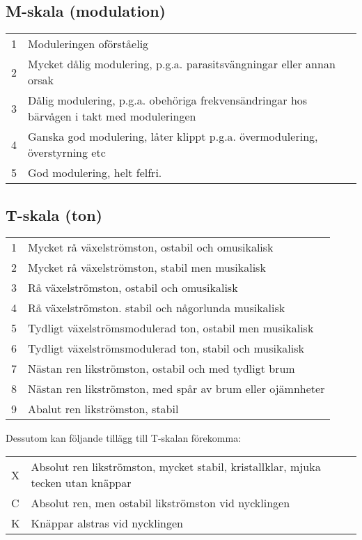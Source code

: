 \subsection{M-skala (modulation)}

\begin{tabular}{p{}p{}}
1 & Moduleringen oförståelig \\
2 & Mycket dålig modulering, p.g.a. parasitsvängningar eller annan orsak \\
3 & Dålig modulering, p.g.a. obehöriga frekvensändringar hos bärvågen i takt med moduleringen \\
4 & Ganska god modulering, låter klippt p.g.a. övermodulering, överstyrning etc \\
5 & God modulering, helt felfri. \\
\end{tabular}

\subsection{T-skala (ton)}

\begin{tabular}{p{}p{}}
1 & Mycket rå växelströmston, ostabil och omusikalisk \\
2 & Mycket rå växelströmston, stabil men musikalisk \\
3 & Rå växelströmston, ostabil och omusikalisk \\
4 & Rå växelströmston. stabil och någorlunda musikalisk \\
5 & Tydligt växelströmsmodulerad ton, ostabil men musikalisk \\
6 & Tydligt växelströmsmodulerad ton, stabil och musikalisk \\
7 & Nästan ren likströmston, ostabil och med tydligt brum \\
8 & Nästan ren likströmston, med spår av brum eller ojämnheter \\
9 & Abalut ren likströmston, stabil \\
\end{tabular}

Dessutom kan följande tillägg till T-skalan förekomma:

\begin{tabular}{p{}p{}}
X & Absolut ren likströmston, mycket stabil, kristallklar, mjuka tecken utan knäppar \\
C & Absolut ren, men ostabil likströmston vid nycklingen \\
K & Knäppar alstras vid nycklingen \\
\end{tabular}

